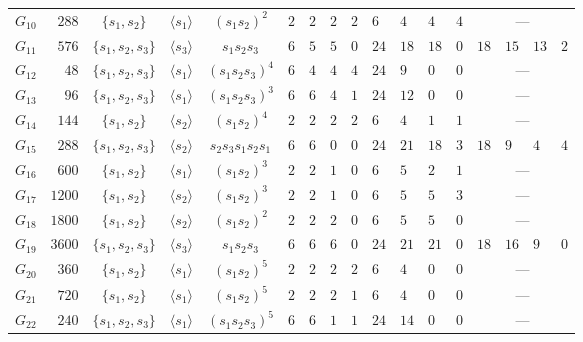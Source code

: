 \documentclass[11pt, reqno]{amsart}
\numberwithin{equation}{section}
\theoremstyle{remark}
\begin{document}
\begin{figure}[tbp]
\begin{adjustbox}{max width=\textwidth}
\begin{tabular}{c|r|c|r@{${}={}$}l|c||w{c}{\bfscol}w{c}{\bfscol}w{c}{\bfscol}w{c}{\bfscol}||w{c}{\bfscol}w{c}{\bfscol}w{c}{\bfscol}w{c}{\bfscol}||w{c}{\bfscol}w{c}{\bfscol}w{c}{\bfscol}w{c}{\bfscol}}
				$G_{10}$ & $288$ & $\{s_1,s_2\}$ &  & $(s_1s_2)^2$ & $2$ & $2$ & $2$ & $2$ & $6$ & $4$ & $4$ & $4$ &  \\
				$G_{11}$ & $576$ & $\{s_1,s_2,s_3\}$ &  & $s_1s_2s_3$ & $6$ & $5$ & $5$ & $0$ & $24$ & $18$ & $18$ & $0$ & $18$ & $15$ & $13$ & $2$ \\
				$G_{12}$ & $48$ & $\{s_1,s_2,s_3\}$ &  & $(s_1s_2s_3)^4$ & $6$ & $4$ & $4$ & $4$ & $24$ & $9$ & $0$ & $0$ &  \\
				$G_{13}$ & $96$ & $\{s_1,s_2,s_3\}$ &  & $(s_1s_2s_3)^3$ & $6$ & $6$ & $4$ & $1$ & $24$ & $12$ & $0$ & $0$ &  \\
				$G_{14}$ & $144$ & $\{s_1,s_2\}$ &  & $(s_1s_2)^4$ & $2$ & $2$ & $2$ & $2$ & $6$ & $4$ & $1$ & $1$ &  \\
				$G_{15}$ & $288$ & $\{s_1,s_2,s_3\}$ &  & $s_2s_3s_1s_2s_1$ & $6$ & $6$ & $0$ & $0$ & $24$ & $21$ & $18$ & $3$ & $18$ & $9$ & $4$ & $4$ \\
				$G_{16}$ & $600$ & $\{s_1,s_2\}$ &  & $(s_1s_2)^3$ & $2$ & $2$ & $1$ & $0$ & $6$ & $5$ & $2$ & $1$ &  \\
				$G_{17}$ & $1200$ & $\{s_1,s_2\}$ &  & $(s_1s_2)^3$ & $2$ & $2$ & $1$ & $0$ & $6$ & $5$ & $5$ & $3$ &  \\
				$G_{18}$ & $1800$ & $\{s_1,s_2\}$ &  & $(s_1s_2)^2$ & $2$ & $2$ & $2$ & $0$ & $6$ & $5$ & $5$ & $0$ &  \\
				$G_{19}$ & $3600$ & $\{s_1,s_2,s_3\}$ &  & $s_1s_2s_3$ & $6$ & $6$ & $6$ & $0$ & $24$ & $21$ & $21$ & $0$ & $18$ & $16$ & $9$ & $0$ \\
				$G_{20}$ & $360$ & $\{s_1,s_2\}$ &  & $(s_1s_2)^5$ & $2$ & $2$ & $2$ & $2$ & $6$ & $4$ & $0$ & $0$ &  \\
				$G_{21}$ & $720$ & $\{s_1,s_2\}$ &  & $(s_1s_2)^5$ & $2$ & $2$ & $2$ & $1$ & $6$ & $4$ & $0$ & $0$ &  \\
				$G_{22}$ & $240$ & $\{s_1,s_2,s_3\}$ &  & $(s_1s_2s_3)^5$ & $6$ & $6$ & $1$ & $1$ & $24$ & $14$ & $0$ & $0$ &  \\

\end{tabular}
\end{adjustbox}
\end{figure}
\end{document}
